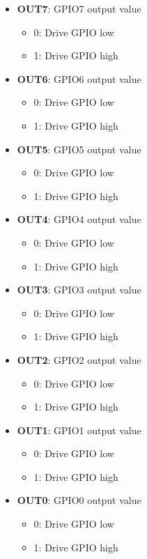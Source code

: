 \documentclass{article}
\begin{document}
		\begin{itemize}
			\item \textbf{OUT7}: GPIO7 output value
			\begin{itemize}
				\item 0: Drive GPIO low
				\item 1: Drive GPIO high
			\end{itemize}
			\item \textbf{OUT6}: GPIO6 output value
			\begin{itemize}
				\item 0: Drive GPIO low
				\item 1: Drive GPIO high
			\end{itemize}
			\item \textbf{OUT5}: GPIO5 output value
			\begin{itemize}
				\item 0: Drive GPIO low
				\item 1: Drive GPIO high
			\end{itemize}
			\item \textbf{OUT4}: GPIO4 output value
			\begin{itemize}
				\item 0: Drive GPIO low
				\item 1: Drive GPIO high
			\end{itemize}
			\item \textbf{OUT3}: GPIO3 output value
			\begin{itemize}
				\item 0: Drive GPIO low
				\item 1: Drive GPIO high
			\end{itemize}
			\item \textbf{OUT2}: GPIO2 output value
			\begin{itemize}
				\item 0: Drive GPIO low
				\item 1: Drive GPIO high
			\end{itemize}
			\item \textbf{OUT1}: GPIO1 output value
			\begin{itemize}
				\item 0: Drive GPIO low
				\item 1: Drive GPIO high
			\end{itemize}
			\item \textbf{OUT0}: GPIO0 output value
			\begin{itemize}
				\item 0: Drive GPIO low
				\item 1: Drive GPIO high
			\end{itemize}
		\end{itemize}
\end{document}
